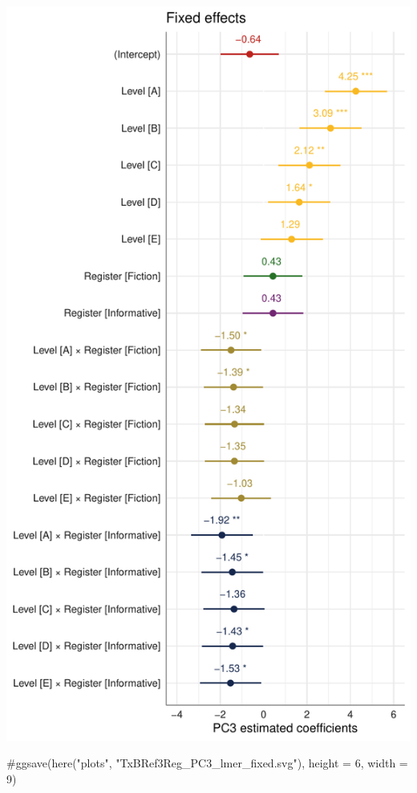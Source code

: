 \documentclass[
  letterpaper,
  DIV=11,
  numbers=noendperiod]{scrreprt}
\newenvironment{Shaded}{\begin{snugshade}}{\end{snugshade}}
\newcommand{\CommentTok}[1]{\textcolor[rgb]{0.37,0.37,0.37}{#1}}
\begin{document}
\includegraphics{G_Ch7_Analysis_files/figure-pdf/Dim3fixed-1.pdf}

\begin{Shaded}
\begin{Highlighting}[]
\CommentTok{\#ggsave(here("plots", "TxBRef3Reg\_PC3\_lmer\_fixed.svg"), height = 6, width = 9)}
\end{Highlighting}
\end{Shaded}
\end{document}
